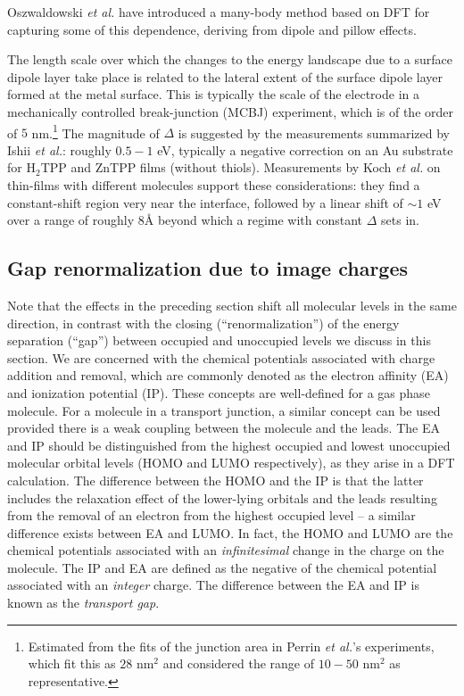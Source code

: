 \documentclass[aip,jcp,a4paper,reprint,floatfix,superscriptaddress]{revtex4-1}
\newcommand{\etal}{\emph{et al.}\xspace}
\begin{document}
Oszwaldowski \etal have introduced a many-body method based on DFT\cite{Oszwaldowski2003} for capturing some of this dependence, deriving from dipole and pillow effects. 

The length scale over which the changes to the energy landscape due to a surface dipole layer take place is related to the lateral extent of the surface dipole layer formed at the metal surface. This is typically the scale of the electrode in a mechanically controlled break-junction (MCBJ) experiment, which is of the order of $5$ nm.\footnote{Estimated from the fits of the junction area in Perrin \etal's experiments\cite{Perrin2013}, which fit this as $28$ nm$^2$ and considered the range of $10-50$ nm$^2$ as representative.}
The magnitude of $\Delta$ is suggested by the measurements summarized by Ishii \etal: roughly $0.5-1$ eV, typically a negative correction on an Au substrate for H$_2$TPP and ZnTPP films (without thiols).\cite{Ishii1999,Ishii2000} 
Measurements by Koch \etal\cite{Duhm2008,Broker2010,Niederhausen2011} on thin-films with different molecules support these considerations: they find a constant-shift region very near the interface, followed by a linear shift of $\sim1$ eV over a range of roughly $8$\AA\xspace beyond which a regime with constant $\Delta$ sets in.

\subsection{Gap renormalization due to image charges}\label{image_model}

Note that the effects in the preceding section shift all molecular levels in the same direction, in contrast with the closing (``renormalization'') of the energy separation (``gap'') between occupied and unoccupied levels we discuss in this section. 
We are concerned with the chemical potentials associated with charge addition and removal, which are commonly denoted as the electron affinity (EA) and ionization potential (IP). These concepts are well-defined for a gas phase molecule. For a molecule in a transport junction, a similar concept 
can be used provided there is a weak coupling between the molecule and the leads. The EA and IP should be distinguished 
from the highest occupied and lowest unoccupied molecular orbital levels (HOMO and LUMO respectively), as they arise in a DFT calculation.
The difference between the HOMO and the IP is that the latter includes the relaxation effect of the lower-lying orbitals and the leads 
resulting from the removal 
of an electron from the highest occupied level -- a similar difference exists between EA and LUMO. 
In fact, the HOMO and LUMO are the chemical potentials associated with an \emph{infinitesimal} change in the charge on the molecule. The 
IP and EA are defined as the negative of the chemical potential associated with an \emph{integer} charge.
The difference between the EA and IP is
known as the \emph{transport gap}.
\end{document}
